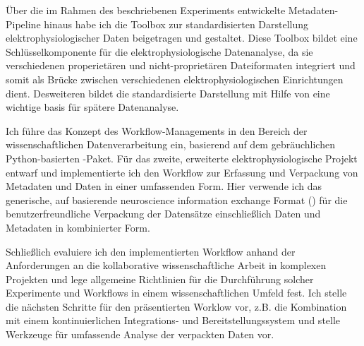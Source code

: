 Über die im Rahmen des beschriebenen Experiments entwickelte Metadaten-Pipeline hinaus habe ich die  Toolbox zur standardisierten Darstellung elektrophysiologischer Daten beigetragen und gestaltet. Diese Toolbox bildet eine Schlüsselkomponente für die elektrophysiologische Datenanalyse, da sie  verschiedenen properietären und nicht-proprietären Dateiformaten integriert und somit als Brücke zwischen verschiedenen elektrophysiologischen Einrichtungen dient. Desweiteren bildet die standardisierte Darstellung mit Hilfe von  eine wichtige basis für spätere Datenanalyse.

Ich führe das Konzept des Workflow-Managements in den Bereich der wissenschaftlichen Datenverarbeitung ein, basierend auf dem gebräuchlichen Python-basierten -Paket. Für das zweite, erweiterte elektrophysiologische Projekt entwarf und implementierte ich den Workflow zur Erfassung und Verpackung von Metadaten und Daten in einer umfassenden Form. Hier verwende ich das generische, auf  basierende neuroscience information exchange Format () für die benutzerfreundliche Verpackung der Datensätze einschließlich Daten und Metadaten in kombinierter Form.

Schließlich evaluiere ich den implementierten Workflow anhand der Anforderungen an die kollaborative wissenschaftliche Arbeit in komplexen Projekten und lege allgemeine Richtlinien für die Durchführung solcher Experimente und Workflows in einem wissenschaftlichen Umfeld fest. Ich stelle die nächsten Schritte für den präsentierten Worklow vor, z.B. die Kombination mit einem kontinuierlichen Integrations- und Bereitstellungssystem und stelle Werkzeuge für umfassende Analyse der verpackten Daten vor.



\vspace{2.5cm}
